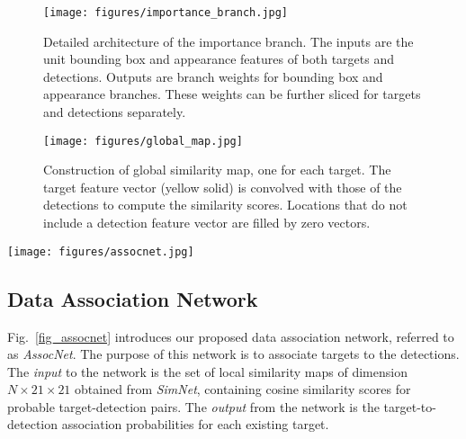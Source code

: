 \documentclass[letterpaper, 10 pt, conference]{ieeeconf}
\begin{document}
\begin{figure}[t]
\vspace{1.5em}
\begin{center}
\texttt{[image: figures/importance\_branch.jpg]}
\end{center}
\caption{Detailed architecture of the importance branch. The inputs are the unit bounding box and appearance features of both targets and detections. Outputs are branch weights for bounding box and appearance branches. These weights can be further sliced for targets and detections separately.}
\label{fig_importance_branch}
\vspace{-1.5em}
\end{figure}
\begin{figure}[t]
\vspace{1.5em}
\begin{center}
\texttt{[image: figures/global\_map.jpg]}
\end{center}
\caption{Construction of global similarity map, one for each target. The target feature vector (yellow solid) is convolved with those of the detections to compute the similarity scores. Locations that do not include a detection feature vector are filled by zero vectors.}
\label{global_map_construction}
\vspace{-1.5em}
\end{figure}




\begin{figure*}[t]
\vspace{1.5em}
\begin{center}
\texttt{[image: figures/assocnet.jpg]}
\end{center}
\caption{The architecture of the proposed association network. The inputs are  local similarity maps from the proposed Siamese network. The outputs are the association maps which provide target-to-detection association and detection probabilities.}
\label{fig_assocnet}
\vspace{-1.5em}
\end{figure*}


\subsection{Data Association Network}
Fig.~\ref{fig_assocnet} introduces our proposed data association network, referred to as \textit{AssocNet}. The purpose of this network is to associate targets to the detections. The \textit{input} to the network is the set of local similarity maps of dimension $N\times21\times21$  obtained from \textit{SimNet}, containing cosine similarity scores for probable target-detection pairs. The \textit{output} from the network is the target-to-detection association probabilities for each existing target.
\end{document}
